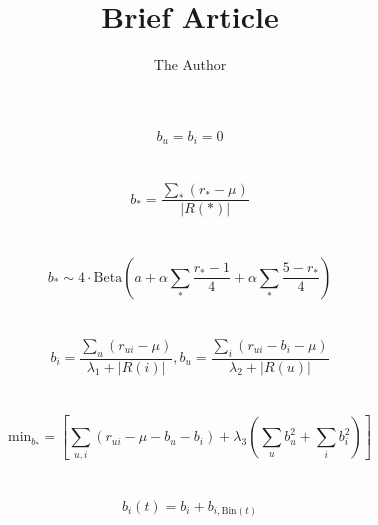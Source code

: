 \documentclass[11pt]{amsart}
\title{Brief Article}
\author{The Author}
\begin{document}
\maketitle
$$b_u = b_i = 0 $$
\\
\\

$$b_* = \frac{\sum_*(r_* - \mu)}{|R(*)|}$$
\\
\\

$$b_* \sim 4 \cdot \textrm{Beta} \left( a + \alpha \sum_* \frac{r_{*}-1}{4}  + \alpha \sum_* \frac{5 - r_{*}}{4} \right)$$
\\
\\
$$b_i = \frac{\sum_u (r_{ui} - \mu)}{\lambda_1 + |R(i)|}, b_u = \frac{\sum_i (r_{ui} -b_i - \mu)}{\lambda_2 + |R(u)|}$$
\\
\\
$$\textrm{min}_{b_*} = \left[ \sum_{u,i} (r_{ui} - \mu - b_u - b_i) + \lambda_3 \left( \sum_u b_u^2 + \sum_i b_i^2 \right) \right]$$
\\
\\
$$b_i(t) = b_i + b_{i, \textrm{Bin}(t)} $$
\end{document}
